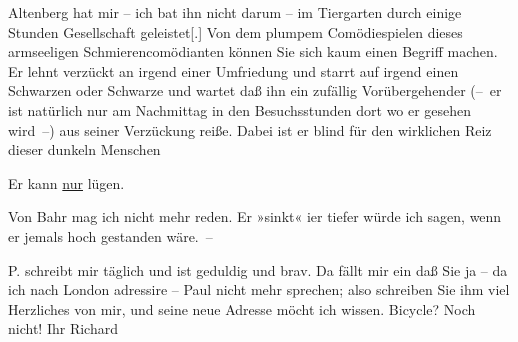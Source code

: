 \pstart
           Altenberg hat mir – ich bat ihn nicht darum –
                  {\pb}im Tiergarten durch einige Stunden Gesellschaft
                  geleistet{[}.{]} Von dem plumpem Comödiespielen dieses armseeligen
               Schmierencomödianten können Sie sich kaum einen Begriff machen. {\pb}Er lehnt verzückt an irgend einer
               Umfriedung und starrt auf irgend einen Schwarzen oder Schwarze und wartet daß ihn ein
               zufällig Vorübergehender (– er ist natürlich nur am Nachmittag in den Besuchsstunden
               dort wo er gesehen wird –) {\pb}aus
               seiner Verzückung reiße. Dabei ist er blind für den wirklichen Reiz dieser dunkeln
               Menschen\pend
           
\pstart
           Er kann \uline{nur} lügen.\pend
           
\pstart
           Von Bahr mag ich {\pb}nicht mehr reden. Er »sinkt« i{\geminationm}er tiefer würde ich sagen, wenn er jemals hoch
               gestanden wäre. –\pend
           
\pstart
           P. schreibt mir täglich und ist geduldig und
               brav. Da fällt {\pb}mir ein daß Sie ja
               – da ich nach London adressire – Paul nicht mehr sprechen; also schreiben Sie
               ihm viel Herzliches von mir, und seine neue Adresse möcht ich wissen. Bicycle? Noch
               nicht!\pend
           \pstart Ihr \spacefill\mbox{Richard}\pend{}\endnumbering{}  
      